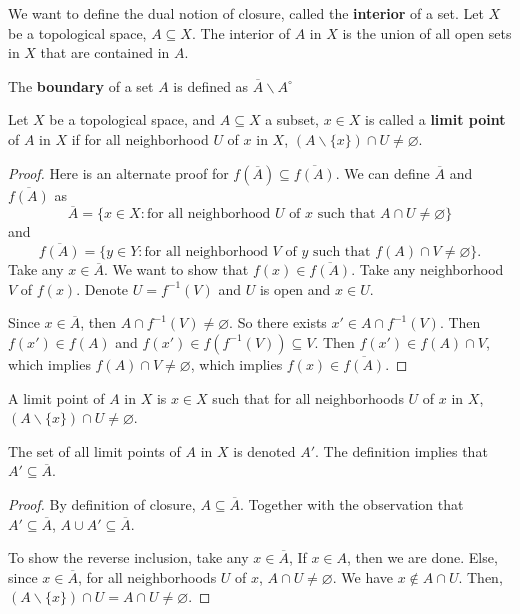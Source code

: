 \documentclass[article,11pt, reqno]{article}
\newtheorem*{lemma}{Lemma}
\theoremstyle{remark}
\newcommand{\<}{\langle}
\renewcommand{\>}{\rangle}
\begin{document}
We want to define the dual notion of closure, called the \textbf{interior} of a set. Let $X$ be a topological space, $A\subseteq X$. The interior of $A$ in $X$ is the union of all open sets in $X$ that are contained in $A$.

The \textbf{boundary} of a set $A$ is defined as $\overline A\backslash A^\circ$

Let $X$ be a topological space, and $A\subseteq X$ a subset, $x\in X$ is called a \textbf{limit point} of $A$ in $X$ if for all neighborhood $U$ of $x$ in $X$, $(A\backslash\{x\})\cap U\neq \varnothing$.

\begin{proof}
    Here is an alternate proof for $f(\overline A)\subseteq \overline{f(A)}$. We can define $\overline A$ and $\overline{f(A)}$ as
    $$\overline A = \{x\in X: \text{for all neighborhood } U \text{ of } x \text{ such that } A\cap U\neq \varnothing\}$$
    and 
    $$\overline{f(A)} = \{y\in Y:\text{for all neighborhood } V \text{ of } y \text{ such that } f(A)\cap V\neq \varnothing\}.$$
    Take any $x\in\overline A$. We want to show that $f(x)\in\overline{f(A)}$. Take any neighborhood $V$ of $f(x)$. Denote $U=f^{-1}(V)$ and $U$ is open and $x\in U$.

    Since $x\in\overline A$, then $A\cap f^{-1}(V)\neq \varnothing$. So there exists $x'\in A\cap f^{-1}(V)$. Then $f(x')\in f(A)$ and $f(x')\in f(f^{-1}(V))\subseteq V$.
    Then $f(x')\in f(A)\cap V$, which implies $f(A)\cap V\neq \varnothing$, which implies $f(x)\in\overline{f(A)}$.
\end{proof}

A limit point of $A$ in $X$ is $x\in X$ such that for all neighborhoods $U$ of $x$ in $X$, $(A\backslash\{x\})\cap U\neq \varnothing$.

The set of all limit points of $A$ in $X$ is denoted $A'$. The definition implies that $A'\subseteq \overline A$.\\
\begin{proof}
    By definition of closure, $A\subseteq \overline A$. Together with the observation that $A'\subseteq \overline A$, $A\cup A'\subseteq \overline A$.

    To show the reverse inclusion, take any $x\in \overline A$, If $x\in A$, then we are done. Else, since $x\in \overline A$, for all neighborhoods $U$ of $x$, $A\cap U\neq\varnothing$. We have $x\notin A\cap U$. Then, $(A\backslash\{x\})\cap U=A\cap U\neq\varnothing$.
\end{proof}
\end{document}
